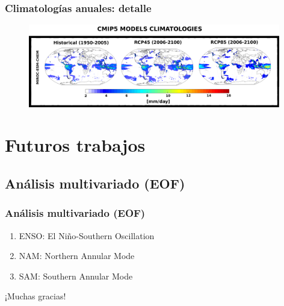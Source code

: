 \documentclass{beamer}
\begin{document}
		\begin{frame}
			\frametitle{Climatologías anuales: detalle}
			\begin{figure}[!hbt]
		   		\centering
		   		\includegraphics[width=11cm]{detalle-graficas.png}
			\end{figure}
		\end{frame}

	\section{Futuros trabajos}
	\subsection{Análisis multivariado (EOF)}
	\begin{frame}
		\frametitle{Análisis multivariado (EOF)}
		\begin{enumerate}
			\item ENSO: El Niño-Southern Oscillation 
			\item NAM: Northern Annular Mode
			\item SAM: Southern Annular Mode
		\end{enumerate}

	\end{frame} 

	\begin{frame}
		\begin{center}
			\Huge ¡Muchas gracias!
		\end{center}
	\end{frame}
\end{document}
